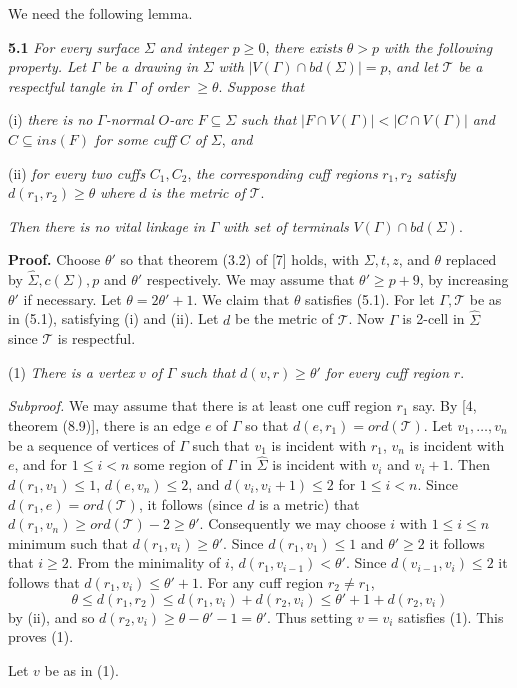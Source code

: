 We need the following lemma.

\textbf{5.1} \textit{For every surface} $\Sigma$ \textit{and integer} $p \ge 0$, \textit{there exists} $\theta > p$ \textit{with the following property. Let} $\Gamma$ \textit{be a drawing in} $\Sigma$ \textit{with} $|V(\Gamma) \cap bd(\Sigma)| = p$, \textit{and let} $\mathcal{T}$ \textit{be a respectful tangle in} $\Gamma$ \textit{of order} $\ge \theta$. \textit{Suppose that}

\hspace*{12pt}(i) \textit{there is no} $\Gamma$\textit{-normal} $O$\textit{-arc} $F \subseteq \Sigma$ \textit{such that} $|F \cap V(\Gamma)| < |C \cap V(\Gamma)|$ \textit{and} $C \subseteq ins(F)$ \textit{for some cuff} $C$ \textit{of} $\Sigma$, \textit{and}

\hspace*{12pt}(ii) \textit{for every two cuffs} $C_1, C_2$, \textit{the corresponding cuff regions} $r_1, r_2$ \textit{satisfy} $d(r_1, r_2) \ge \theta$ \textit{where} $d$ \textit{is the metric of} $\mathcal{T}$.

\textit{Then there is no vital linkage in} $\Gamma$ \textit{with set of terminals} $V(\Gamma) \cap bd(\Sigma)$.

\textbf{Proof.} Choose $\theta'$ so that theorem (3.2) of [7] holds, with $\Sigma, t, z$, and $\theta$ replaced by $\hat{\Sigma}, c(\Sigma), p$ and $\theta'$ respectively. We may assume that $\theta' \ge p + 9$, by increasing $\theta'$ if necessary. Let $\theta = 2\theta' + 1$. We claim that $\theta$ satisfies (5.1). For let $\Gamma, \mathcal{T}$ be as in (5.1), satisfying (i) and (ii). Let $d$ be the metric of $\mathcal{T}$. Now $\Gamma$ is 2-cell in $\hat{\Sigma}$ since $\mathcal{T}$ is respectful.

\hspace*{12pt}(1) \textit{There is a vertex} $v$ \textit{of} $\Gamma$ \textit{such that} $d(v, r) \ge \theta'$ \textit{for every cuff region} $r$.

\textit{Subproof.} We may assume that there is at least one cuff region $r_1$ say. By [4, theorem (8.9)], there is an edge $e$ of $\Gamma$ so that $d(e, r_1) = ord(\mathcal{T})$. Let $v_1, \dots, v_n$ be a sequence of vertices of $\Gamma$ such that $v_1$ is incident with $r_1$, $v_n$ is incident with $e$, and for $1 \le i < n$ some region of $\Gamma$ in $\hat{\Sigma}$ is incident with $v_i$ and $v_i + 1$. Then $d(r_1, v_1) \le 1$, $d(e, v_n) \le 2$, and $d(v_i, v_i + 1) \le 2$ for $1 \le i < n$. Since $d(r_1, e) = ord(\mathcal{T})$, it follows (since $d$ is a metric) that $d(r_1, v_n) \ge ord(\mathcal{T}) - 2 \ge \theta'$. Consequently we may choose $i$ with $1 \le i \le n$ minimum such that $d(r_1, v_i) \ge \theta'$. Since $d(r_1, v_1) \le 1$ and $\theta' \ge 2$ it follows that $i \ge 2$. From the minimality of $i$, $d(r_1, v_{i-1}) < \theta'$. Since $d(v_{i-1}, v_i) \le 2$ it follows that $d(r_1, v_i) \le \theta' + 1$. For any cuff region $r_2 \ne r_1$,
\begin{equation*}
\theta \le d(r_1, r_2) \le d(r_1, v_i) + d(r_2, v_i) \le \theta' + 1 + d(r_2, v_i)
\end{equation*}
by (ii), and so $d(r_2, v_i) \ge \theta - \theta' - 1 = \theta'$. Thus setting $v = v_i$ satisfies (1). This proves (1).

Let $v$ be as in (1).
